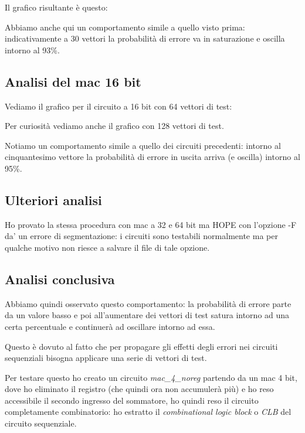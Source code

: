 \documentclass[12pt, letterpaper]{article}
\begin{document}
Il grafico risultante è questo:



Abbiamo anche qui un comportamento simile a quello visto prima: indicativamente a 30 vettori la probabilità di errore va in saturazione e oscilla intorno al 93\%.

\subsection{Analisi del mac 16 bit}
Vediamo il grafico per il circuito a 16 bit con 64 vettori di test:



Per curiosità vediamo anche il grafico con 128 vettori di test.



Notiamo un comportamento simile a quello dei circuiti precedenti: intorno al cinquantesimo vettore la probabilità di errore in uscita arriva (e oscilla) intorno al 95\%.

\subsection{Ulteriori analisi}

Ho provato la stessa procedura con mac a 32 e 64 bit ma HOPE con l'opzione -F da' un errore di segmentazione: i circuiti sono testabili normalmente ma per qualche motivo non riesce a salvare il file di tale opzione.

\subsection{Analisi conclusiva}

Abbiamo quindi osservato questo comportamento: la probabilità di errore parte da un valore basso e poi all'aumentare dei vettori di test satura intorno ad una certa percentuale e continuerà ad oscillare intorno ad essa.

Questo è dovuto al fatto che per propagare gli effetti degli errori nei circuiti sequenziali bisogna applicare una serie di vettori di test.

Per testare questo ho creato un circuito \textit{mac\_4\_noreg} partendo da un mac 4 bit, dove ho eliminato il registro (che quindi ora non accumulerà più) e ho reso accessibile il secondo ingresso del sommatore, ho quindi reso il circuito completamente combinatorio: ho estratto il \textit{combinational logic block} o \textit{CLB} del circuito sequenziale.
\end{document}
